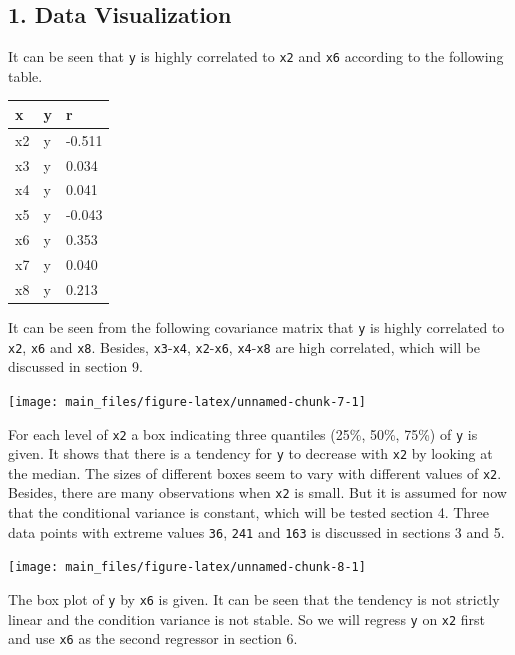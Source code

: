 \documentclass[a4paper]{article}
\begin{document}
\hypertarget{data-visualization}{%
\subsection{1. Data Visualization}\label{data-visualization}}

It can be seen that \texttt{y} is highly correlated to \texttt{x2} and
\texttt{x6} according to the following table.

\begin{table}[H]
\centering
\begin{tabular}{lll}
\toprule
x & y & r\\
\midrule
x2 & y & -0.511\\
x3 & y & 0.034\\
x4 & y & 0.041\\
x5 & y & -0.043\\
x6 & y & 0.353\\
x7 & y & 0.040\\
x8 & y & 0.213\\
\bottomrule
\end{tabular}
\end{table}

It can be seen from the following covariance matrix that \texttt{y} is
highly correlated to \texttt{x2}, \texttt{x6} and \texttt{x8}. Besides,
\texttt{x3}-\texttt{x4}, \texttt{x2}-\texttt{x6},
\texttt{x4}-\texttt{x8} are high correlated, which will be discussed in
section 9.

\begin{center}\texttt{[image: main\_files/figure-latex/unnamed-chunk-7-1]} \end{center}

For each level of \texttt{x2} a box indicating three quantiles (25\%,
50\%, 75\%) of \texttt{y} is given. It shows that there is a tendency
for \texttt{y} to decrease with \texttt{x2} by looking at the median.
The sizes of different boxes seem to vary with different values of
\texttt{x2}. Besides, there are many observations when \texttt{x2} is
small. But it is assumed for now that the conditional variance is
constant, which will be tested section 4. Three data points with extreme
values \texttt{36}, \texttt{241} and \texttt{163} is discussed in
sections 3 and 5.

\begin{center}\texttt{[image: main\_files/figure-latex/unnamed-chunk-8-1]} \end{center}

The box plot of \texttt{y} by \texttt{x6} is given. It can be seen that
the tendency is not strictly linear and the condition variance is not
stable. So we will regress \texttt{y} on \texttt{x2} first and use
\texttt{x6} as the second regressor in section 6.
\end{document}
